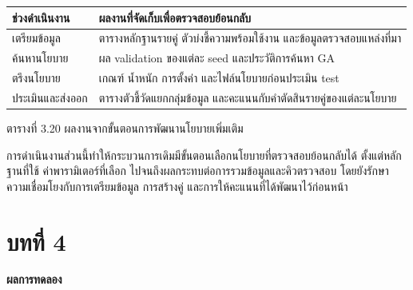 \documentclass[12pt,a4paper]{report}
\begin{document}
\begin{center}\small
\begin{tabularx}{\linewidth}{p{3.4cm}X}
\toprule
ช่วงดำเนินงาน & ผลงานที่จัดเก็บเพื่อตรวจสอบย้อนกลับ \\
\midrule
เตรียมข้อมูล & ตารางหลักฐานรายคู่ ตัวบ่งชี้ความพร้อมใช้งาน และข้อมูลตรวจสอบแหล่งที่มา \\
ค้นหานโยบาย & ผล validation ของแต่ละ seed และประวัติการค้นหา GA \\
ตรึงนโยบาย & เกณฑ์ น้ำหนัก การตั้งค่า และไฟล์นโยบายก่อนประเมิน test \\
ประเมินและส่งออก & ตารางตัวชี้วัดแยกกลุ่มข้อมูล และคะแนนกับคำตัดสินรายคู่ของแต่ละนโยบาย \\
\bottomrule
\end{tabularx}
\par ตารางที่ 3.20 ผลงานจากขั้นตอนการพัฒนานโยบายเพิ่มเติม
\end{center}

การดำเนินงานส่วนนี้ทำให้กระบวนการเดิมมีขั้นตอนเลือกนโยบายที่ตรวจสอบย้อนกลับได้ ตั้งแต่หลักฐานที่ใช้ ค่าพารามิเตอร์ที่เลือก ไปจนถึงผลกระทบต่อการรวมข้อมูลและคิวตรวจสอบ โดยยังรักษาความเชื่อมโยงกับการเตรียมข้อมูล การสร้างคู่ และการให้คะแนนที่ได้พัฒนาไว้ก่อนหน้า

\clearpage
\chapter*{บทที่ 4}
\begin{center}\Large\bfseries ผลการทดลอง\end{center}
\end{document}

